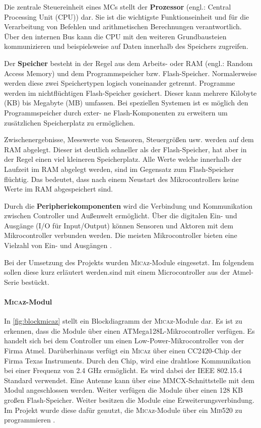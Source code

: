 Die zentrale Steuereinheit eines MCs stellt der \textbf{Prozessor} (engl.: Central Processing Unit (CPU)) dar. Sie ist die wichtigste Funktionseinheit und für die Verarbeitung von Befehlen und arithmetischen Berechnungen verantwortlich. Über den internen Bus kann die CPU mit den weiteren Grundbausteien kommunizieren und beispielsweise auf Daten innerhalb des Speichers zugreifen.

Der \textbf{Speicher} besteht in der Regel aus dem Arbeits- oder RAM (engl.: Random Access Memory) und dem Programmspeicher bzw. Flash-Speicher. Normalerweise werden diese zwei Speichertypen logisch voneinander getrennt. Programme werden im nichtflüchtigen Flash-Speicher gesichert. Dieser kann mehrere Kilobyte (KB) bis Megabyte (MB) umfassen. Bei speziellen Systemen ist es möglich den Programmspeicher durch exter-
ne Flash-Komponenten zu erweitern um zusätzlichen Speicherplatz zu ermöglichen.

Zwischenergebnisse, Messwerte von Sensoren, Steuergrößen usw. werden auf dem RAM abgelegt. Dieser ist deutlich schneller als der Flash-Speicher, hat aber in der Regel einen viel kleineren Speicherplatz. Alle Werte welche innerhalb der Laufzeit im RAM abgelegt werden, sind im Gegensatz zum Flash-Speicher flüchtig. Das bedeutet, dass nach einem Neustart des Mikrocontrollers keine Werte im RAM abgespeichert sind.

Durch die \textbf{Peripheriekomponenten} wird die Verbindung und Kommunikation zwischen Controller und Außenwelt ermöglicht. Über die digitalen Ein- und Ausgänge (I/O für Input/Output) können Sensoren und Aktoren mit dem Mikrocontroller verbunden werden. Die meisten Mikrocontroller bieten eine Vielzahl von Ein- und Ausgängen \cite[S. 13-16]{SOM2012}.

Bei der Umsetzung des Projekts wurden \textsc{Mica}z-Module eingesetzt. Im folgendem sollen diese kurz erläutert werden.sind mit einem Microcontroller aus der Atmel-Serie bestückt.

\paragraph{\textsc{Mica}z-Modul}
In \autoref{fig:blockmicaz} stellt ein Blockdiagramm der \textsc{Mica}z-Module dar. Es ist zu erkennen, dass die Module über einen ATMega128L-Mikrocontroller verfügen. Es handelt sich bei dem Controller um einen Low-Power-Mikrocontroller von der Firma Atmel. Darüberhinaus verfügt ein \textsc{Mica}z über einen CC2420-Chip der Firma Texas Instruments. Durch den Chip, wird eine drahtlose Kommunikation bei einer Frequenz von 2.4 GHz ermöglicht. Es wird dabei der IEEE 802.15.4 Standard verwendet. Eine Antenne kann über eine MMCX-Schnittstelle mit dem Modul angeschlossen werden. Weiter verfügen die Module über einen 128 KB großen Flash-Speicher. Weiter besitzen die Module eine Erweiterungsverbindung. Im Projekt wurde diese dafür genutzt, die \textsc{Mica}z-Module über ein \textsc{Mib}520 zu programmieren \cite{MICSHEET,C2420SHEET}.

